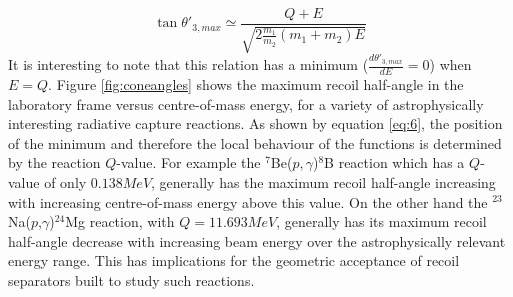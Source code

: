 \begin{equation} \label{eq:6}
\tan{\theta'_{3,max}}\simeq\frac{Q+E}{\sqrt{2\frac{m_{1}}{m_{2}}(m_{1}+m_{2})E}}
\end{equation}
%
It is interesting to note that this relation has a minimum ($\frac{d\theta'_{3,max}}{dE}=0$) when $E=Q$. Figure \ref{fig:coneangles} shows the maximum recoil half-angle in the laboratory frame versus centre-of-mass energy, for a variety of astrophysically interesting radiative capture reactions. As shown by equation \ref{eq:6}, the position of the minimum and therefore the local behaviour of the functions is determined by the reaction $Q$-value. For example the $^{7}$Be($p,\gamma$)$^{8}$B reaction which has a $Q$-value of only $0.138 \unit{MeV}$, generally has the maximum recoil half-angle increasing with increasing centre-of-mass energy above this value. On the other hand the $^{23}$Na($p$,$\gamma$)$^{24}$Mg reaction, with $Q=11.693 \unit{MeV}$, generally has its maximum recoil half-angle decrease with increasing beam energy over the astrophysically relevant energy range. This has implications for the geometric acceptance of recoil separators built to study such reactions. 

